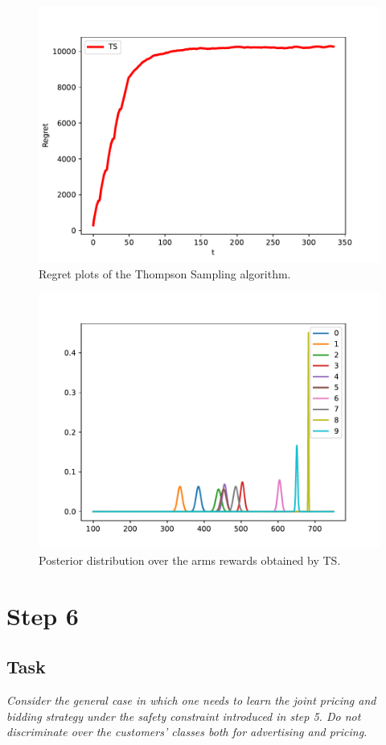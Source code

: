 \documentclass[12pt,a4paper]{report}
\begin{document}
\begin{figure}[H]
\centering
  \includegraphics[scale = 0.8, center]{5r}
  \caption{Regret plots of the Thompson Sampling algorithm.}
\end{figure}
\begin{figure}[H]
\centering
  \includegraphics[scale = 0.8, center]{5arms}
  \caption{Posterior distribution over the arms rewards obtained by TS.}
\end{figure}
		\section{Step 6}
			\subsection{Task}
\textit{Consider the general case in which one needs to learn the joint pricing and bidding strategy under the safety constraint introduced in step 5. Do not discriminate over the customers’ classes both for advertising and pricing.}
\end{document}
